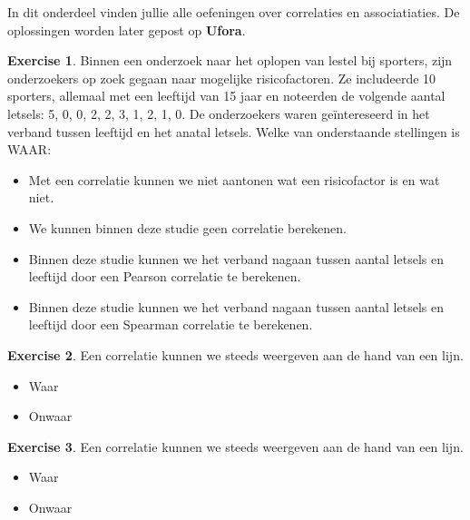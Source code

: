 \documentclass[
]{book}
\providecommand{\tightlist}{%
  \setlength{\itemsep}{0pt}\setlength{\parskip}{0pt}}
\theoremstyle{definition}
\theoremstyle{definition}
\theoremstyle{definition}
\newtheorem{exercise}{Exercise}[chapter]
\theoremstyle{definition}
\theoremstyle{remark}
\begin{document}
In dit onderdeel vinden jullie alle oefeningen over correlaties en associatiaties. De oplossingen worden later gepost op \textbf{Ufora}.

\begin{exercise}

Binnen een onderzoek naar het oplopen van lestel bij sporters, zijn onderzoekers op zoek gegaan naar mogelijke risicofactoren. Ze includeerde 10 sporters, allemaal met een leeftijd van 15 jaar en noteerden de volgende aantal letsels: 5, 0, 0, 2, 2, 3, 1, 2, 1, 0. De onderzoekers waren geïntereseerd in het verband tussen leeftijd en het anatal letsels. Welke van onderstaande stellingen is WAAR:

\begin{itemize}
\tightlist
\item
  Met een correlatie kunnen we niet aantonen wat een risicofactor is en wat niet.
\item
  We kunnen binnen deze studie geen correlatie berekenen.
\item
  Binnen deze studie kunnen we het verband nagaan tussen aantal letsels en leeftijd door een Pearson correlatie te berekenen.
\item
  Binnen deze studie kunnen we het verband nagaan tussen aantal letsels en leeftijd door een Spearman correlatie te berekenen.
\end{itemize}

\end{exercise}

\begin{exercise}

Een correlatie kunnen we steeds weergeven aan de hand van een lijn.

\begin{itemize}
\tightlist
\item
  Waar
\item
  Onwaar
\end{itemize}

\end{exercise}

\begin{exercise}

Een correlatie kunnen we steeds weergeven aan de hand van een lijn.

\begin{itemize}
\tightlist
\item
  Waar
\item
  Onwaar
\end{itemize}

\end{exercise}
\end{document}
